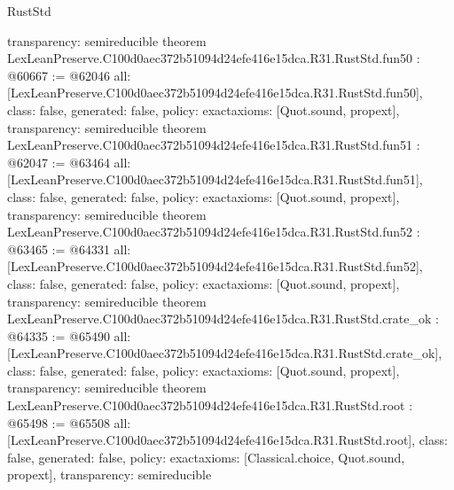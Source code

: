 \begin{lexlean}{RustStd}
\begin{coremodule}
{  transparency: semireducible
}
theorem LexLeanPreserve.C100d0aec372b51094d24efe416e15dca.R31.RustStd.fun50 : @60667 := @62046 {
  all: [LexLeanPreserve.C100d0aec372b51094d24efe416e15dca.R31.RustStd.fun50],
  class: false,
  generated: false,
  policy: exact{axioms: [Quot.sound, propext]},
  transparency: semireducible
}
theorem LexLeanPreserve.C100d0aec372b51094d24efe416e15dca.R31.RustStd.fun51 : @62047 := @63464 {
  all: [LexLeanPreserve.C100d0aec372b51094d24efe416e15dca.R31.RustStd.fun51],
  class: false,
  generated: false,
  policy: exact{axioms: [Quot.sound, propext]},
  transparency: semireducible
}
theorem LexLeanPreserve.C100d0aec372b51094d24efe416e15dca.R31.RustStd.fun52 : @63465 := @64331 {
  all: [LexLeanPreserve.C100d0aec372b51094d24efe416e15dca.R31.RustStd.fun52],
  class: false,
  generated: false,
  policy: exact{axioms: [Quot.sound, propext]},
  transparency: semireducible
}
theorem LexLeanPreserve.C100d0aec372b51094d24efe416e15dca.R31.RustStd.crate_ok : @64335 := @65490 {
  all: [LexLeanPreserve.C100d0aec372b51094d24efe416e15dca.R31.RustStd.crate_ok],
  class: false,
  generated: false,
  policy: exact{axioms: [Quot.sound, propext]},
  transparency: semireducible
}
theorem LexLeanPreserve.C100d0aec372b51094d24efe416e15dca.R31.RustStd.root : @65498 := @65508 {
  all: [LexLeanPreserve.C100d0aec372b51094d24efe416e15dca.R31.RustStd.root],
  class: false,
  generated: false,
  policy: exact{axioms: [Classical.choice, Quot.sound, propext]},
  transparency: semireducible
}


\end{coremodule}
\end{lexlean}
